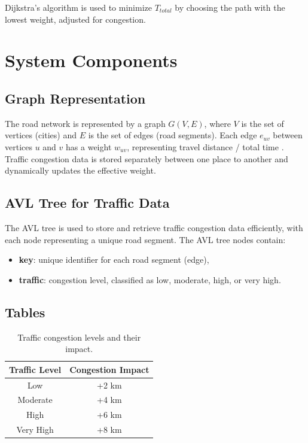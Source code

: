 \documentclass{article}
\begin{document}
Dijkstra's algorithm is used to minimize \( T_{total} \) by choosing the path with the lowest  weight, adjusted for congestion.

\section{System Components}

\subsection{Graph Representation}
The road network is represented by a graph \( G(V, E) \), where \( V \) is the set of vertices (cities) and \( E \) is the set of edges (road segments). Each edge \( e_{uv} \) between vertices \( u \) and \( v \) has a weight \( w_{uv} \), representing travel distance / total time . Traffic congestion data is stored separately between one place to another and dynamically updates the effective weight.

\subsection{AVL Tree for Traffic Data}
The AVL tree is used to store and retrieve traffic congestion data efficiently, with each node representing a unique road segment. The AVL tree nodes contain:
\begin{itemize}
    \item \textbf{key}: unique identifier for each road segment (edge),
    \item \textbf{traffic}: congestion level, classified as low, moderate, high, or very high.


\end{itemize}

\subsection{Tables}
\begin{table}[h!]
    \centering
    \begin{tabular}{|c|c|}
        \hline
        Traffic Level & Congestion Impact \\
        \hline
        Low & +2 km \\
        Moderate & +4 km \\
        High & +6 km \\
        Very High & +8 km \\
        \hline
    \end{tabular}
    \caption{Traffic congestion levels and their impact.}
\end{table}
\end{document}
